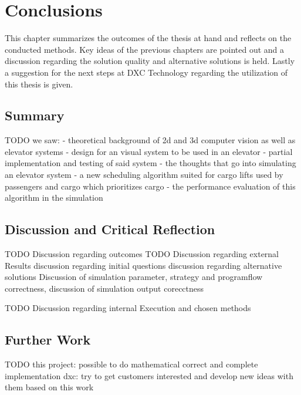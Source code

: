 \chapter{Conclusions}
\label{chap:concl}

This chapter summarizes the outcomes of the thesis at hand 
and reflects on the conducted methods.
Key ideas of the previous chapters are pointed out and a discussion regarding the solution quality and alternative solutions is held.
Lastly a suggestion for the next steps at DXC Technology regarding the utilization of this thesis is given.

\section{Summary}

TODO
we saw:
- theoretical background of 2d and 3d computer vision as well as elevator systems
- design for an visual system to be used in an elevator
- partial implementation and testing of said system
- the thoughts that go into simulating an elevator system
- a new scheduling algorithm suited for cargo lifts used by passengers and cargo
which prioritizes cargo
- the performance evaluation of this algorithm in the simulation


\section{Discussion and Critical Reflection}

TODO Discussion regarding outcomes
TODO Discussion regarding external Results
discussion regarding initial questions
discussion regarding alternative solutions
Discussion of simulation parameter, strategy and programflow correctness, discussion of simulation output corecctness

TODO  Discussion regarding internal Execution and chosen methods


\section{Further Work}

TODO
this project: possible to do mathematical correct and complete implementation
dxc: try to get customers interested and develop new ideas with them based on this work


